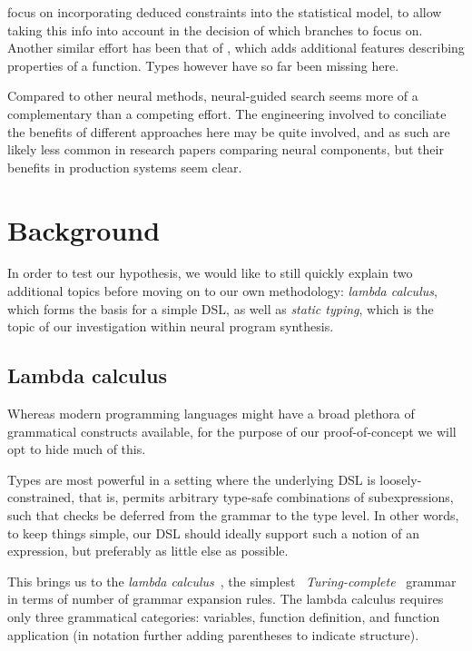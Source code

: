 \documentclass{article}
\begin{document}
\citet{zhang2018leveraging} focus on incorporating deduced constraints
into the statistical model, to allow taking this info into account
in the decision of which branches to focus on.
Another similar effort has been that of \citet{odena2020learning},
which adds additional features describing properties of a function.
Types however have so far been missing here.

Compared to other neural methods, neural-guided search seems
more of a complementary than a competing effort.
The engineering involved to conciliate the benefits of
different approaches here may be quite involved, and as such
are likely less common in research papers comparing neural components,
but their benefits in production systems seem clear.

\section{Background} %

In order to test our hypothesis,
we would like to still quickly explain two additional topics before moving on to our own methodology:
\emph{lambda calculus}, which forms the basis for a simple DSL,
as well as \emph{static typing},
which is the topic of our investigation within neural program synthesis.

\subsection{Lambda calculus} \label{sec:lambdacalc}


Whereas modern programming languages might have a broad plethora of grammatical constructs available,
for the purpose of our proof-of-concept we will opt to hide much of this.

Types are most powerful in a setting where the underlying DSL is loosely-constrained,
that is, permits arbitrary type-safe combinations of subexpressions,
such that checks be deferred from the grammar to the type level.
In other words, to keep things simple,
our DSL should ideally support such a notion of an expression,
but preferably as little else as possible.

This brings us to the \emph{lambda calculus}~\citep{lambdacalculus},
the simplest~\citep{selinger2008lecture}
\emph{Turing-complete}~\citep{turing1936computable} grammar
in terms of number of grammar expansion rules.
The lambda calculus requires only three grammatical categories:
variables, function definition, and function application
(in notation further adding parentheses to indicate structure).
\end{document}
